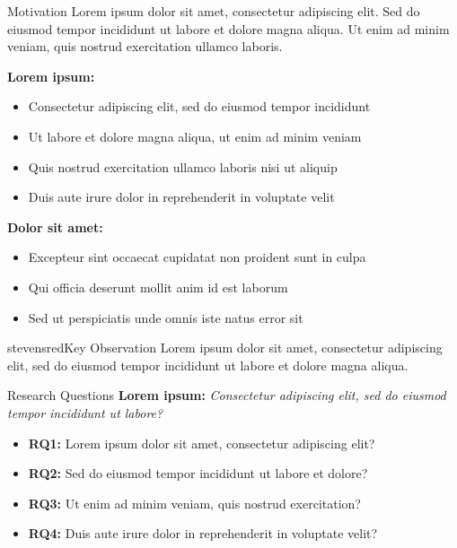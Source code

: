 
\begin{block}{Motivation}
Lorem ipsum dolor sit amet, consectetur adipiscing elit. Sed do eiusmod tempor incididunt ut labore et dolore magna aliqua. Ut enim ad minim veniam, quis nostrud exercitation ullamco laboris.

\vspace{0.4em}
\textbf{Lorem ipsum:}
\begin{itemize}
    \item Consectetur adipiscing elit, sed do eiusmod tempor incididunt
    \item Ut labore et dolore magna aliqua, ut enim ad minim veniam
    \item Quis nostrud exercitation ullamco laboris nisi ut aliquip
    \item Duis aute irure dolor in reprehenderit in voluptate velit
\end{itemize}

\vspace{0.4em}
\textbf{Dolor sit amet:}
\begin{itemize}
    \item Excepteur sint occaecat cupidatat non proident sunt in culpa
    \item Qui officia deserunt mollit anim id est laborum
    \item Sed ut perspiciatis unde omnis iste natus error sit
\end{itemize}
\end{block}

\begin{colorblock}[white]{stevensred}{Key Observation}
Lorem ipsum dolor sit amet, consectetur adipiscing elit, sed do eiusmod tempor incididunt ut labore et dolore magna aliqua.
\end{colorblock}

\begin{block}{Research Questions}
\textbf{Lorem ipsum:} \textit{Consectetur adipiscing elit, sed do eiusmod tempor incididunt ut labore?}

\vspace{0.4em}
\begin{itemize}
    \item \textbf{RQ1:} Lorem ipsum dolor sit amet, consectetur adipiscing elit?
    \item \textbf{RQ2:} Sed do eiusmod tempor incididunt ut labore et dolore?
    \item \textbf{RQ3:} Ut enim ad minim veniam, quis nostrud exercitation?
    \item \textbf{RQ4:} Duis aute irure dolor in reprehenderit in voluptate velit?
\end{itemize}
\end{block}

